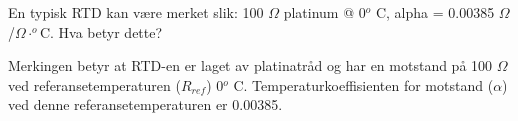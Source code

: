 
En typisk RTD kan være merket slik: 100 $\Omega$ platinum @ 0$^{o}$ C, alpha = 0.00385 $\Omega$/$\Omega \cdot ^{o}$C. Hva betyr dette?







Merkingen betyr at RTD-en er laget av platinatråd og har en motstand på 100 $\Omega$ ved referansetemperaturen ($R_{ref}$) 0$^{o}$ C. Temperaturkoeffisienten for motstand ($\alpha$) ved denne referansetemperaturen er 0.00385.









